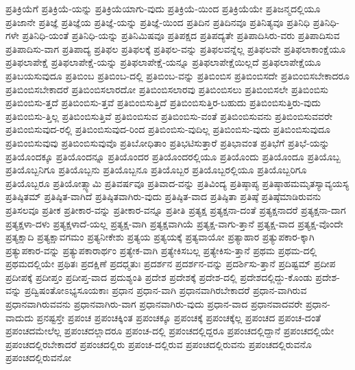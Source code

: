 {ಪ್ರತಿಕ್ರಿಯೆಗೆ
ಪ್ರತಿಕ್ರಿಯೆ-ಯನ್ನು
ಪ್ರತಿಕ್ರಿಯೆಯಾಗು-ವುದು
ಪ್ರತಿಕ್ರಿಯೆ-ಯಿಂದ
ಪ್ರತಿಕ್ರಿಯೆಯೇ
ಪ್ರತಿಜನ್ಮದಲ್ಲಿಯೂ
ಪ್ರತಿಜಾನೇ
ಪ್ರತಿಜ್ಞೆ
ಪ್ರತಿಜ್ಞೆಯ
ಪ್ರತಿಜ್ಞೆ-ಯನ್ನು
ಪ್ರತಿಜ್ಞೆ-ಯಿಂದ
ಪ್ರತಿದಿನ
ಪ್ರತಿದಿನವೂ
ಪ್ರತಿನಿತ್ಯವೂ
ಪ್ರತಿನಿಧಿ
ಪ್ರತಿನಿಧಿ-ಗಳೇ
ಪ್ರತಿನಿಧಿ-ಯಂತೆ
ಪ್ರತಿನಿಧಿ-ಯನ್ನು
ಪ್ರತಿನಿಮಿಷವೂ
ಪ್ರತಿಪಕ್ಷದ
ಪ್ರತಿಪದ್ಯತೇ
ಪ್ರತಿಪಾದಿಸಿರು-ವರು
ಪ್ರತಿಪಾದಿಸುವ
ಪ್ರತಿಪಾದಿಸು-ವಾಗ
ಪ್ರತಿಪಾದ್ಯ
ಪ್ರತಿಫಲ
ಪ್ರತಿಫಲಕ್ಕೆ
ಪ್ರತಿಫಲ-ವನ್ನು
ಪ್ರತಿಫಲವನ್ನೆಲ್ಲ
ಪ್ರತಿಫಲವೇ
ಪ್ರತಿಫಲಾಕಾಂಕ್ಷೆಯೂ
ಪ್ರತಿಫಲಾಪೇಕ್ಷೆ
ಪ್ರತಿಫಲಾಪೇಕ್ಷೆ-ಯನ್ನು
ಪ್ರತಿಫಲಾಪೇಕ್ಷೆ-ಯನ್ನೂ
ಪ್ರತಿಫಲಾಪೇಕ್ಷೆಯಿಲ್ಲದೆ
ಪ್ರತಿಫಲಾಪೇಕ್ಷೆಯೂ
ಪ್ರತಿಬಯಸುವುದೂ
ಪ್ರತಿಬಿಂಬ
ಪ್ರತಿಬಿಂಬ-ದಲ್ಲಿ
ಪ್ರತಿಬಿಂಬ-ವನ್ನು
ಪ್ರತಿಬಿಂಬಿಸ
ಪ್ರತಿಬಿಂಬಿಸದೇ
ಪ್ರತಿಬಿಂಬಿಸಬೇಕಾದರೂ
ಪ್ರತಿಬಿಂಬಿಸಬೇಕಾದರೆ
ಪ್ರತಿಬಿಂಬಿಸಲಾರದೋ
ಪ್ರತಿಬಿಂಬಿಸಲಾರವು
ಪ್ರತಿಬಿಂಬಿಸಲು
ಪ್ರತಿಬಿಂಬಿಸಲೇ
ಪ್ರತಿಬಿಂಬಿಸು
ಪ್ರತಿಬಿಂಬಿಸು-ತ್ತದೆ
ಪ್ರತಿಬಿಂಬಿಸು-ತ್ತವೆ
ಪ್ರತಿಬಿಂಬಿಸುತ್ತಿದೆ
ಪ್ರತಿಬಿಂಬಿಸುತ್ತಿರ-ಬಹುದು
ಪ್ರತಿಬಿಂಬಿಸುತ್ತಿರು-ವುದು
ಪ್ರತಿಬಿಂಬಿಸು-ತ್ತಿಲ್ಲ
ಪ್ರತಿಬಿಂಬಿಸುತ್ತಿವೆ
ಪ್ರತಿಬಿಂಬಿಸುವ
ಪ್ರತಿಬಿಂಬಿಸು-ವಂತೆ
ಪ್ರತಿಬಿಂಬಿಸುವನು
ಪ್ರತಿಬಿಂಬಿಸುವವರೇ
ಪ್ರತಿಬಿಂಬಿಸುವುದ-ರಲ್ಲಿ
ಪ್ರತಿಬಿಂಬಿಸುವುದ-ರಿಂದ
ಪ್ರತಿಬಿಂಬಿಸು-ವುದಿಲ್ಲ
ಪ್ರತಿಬಿಂಬಿಸು-ವುದು
ಪ್ರತಿಬಿಂಬಿಸುವುದೂ
ಪ್ರತಿಬಿಂಬಿಸುವುವು
ಪ್ರತಿಬಿಂಬಿಸುವುವೊ
ಪ್ರತಿಬೋಧಿತಾಂ
ಪ್ರತಿಭಟಿಸುತ್ತಾರೆ
ಪ್ರತಿಭಾವಂತ
ಪ್ರತಿಭೆಗೆ
ಪ್ರತಿಭೆ-ಯನ್ನು
ಪ್ರತಿಯೊಂದಕ್ಕೂ
ಪ್ರತಿಯೊಂದನ್ನೂ
ಪ್ರತಿಯೊಂದರ
ಪ್ರತಿಯೊಂದರಲ್ಲಿಯೂ
ಪ್ರತಿಯೊಂದು
ಪ್ರತಿಯೊಂದೂ
ಪ್ರತಿಯೊಬ್ಬ
ಪ್ರತಿಯೊಬ್ಬನಿಗೂ
ಪ್ರತಿಯೊಬ್ಬನು
ಪ್ರತಿಯೊಬ್ಬನೂ
ಪ್ರತಿಯೊಬ್ಬರ
ಪ್ರತಿಯೊಬ್ಬರಲ್ಲಿಯೂ
ಪ್ರತಿಯೊಬ್ಬರಿಗೂ
ಪ್ರತಿಯೊಬ್ಬರೂ
ಪ್ರತಿಯೋತ್ಸ್ಯಾಮಿ
ಪ್ರತಿವರ್ಷವೂ
ಪ್ರತಿವಾದ-ವನ್ನು
ಪ್ರತಿವಿಂದ್ಯ
ಪ್ರತಿಷ್ಠಾಪ್ಯ
ಪ್ರತಿಷ್ಠಾಹಮಮೃತಸ್ಯಾವ್ಯಯಸ್ಯ
ಪ್ರತಿಷ್ಠಿತಮ್
ಪ್ರತಿಷ್ಠಿತ-ವಾಗಿದೆ
ಪ್ರತಿಷ್ಠಿತವಾಗಿರು-ವುದು
ಪ್ರತಿಷ್ಠಿತ-ವಾದ
ಪ್ರತಿಷ್ಠಿತಾ
ಪ್ರತಿಷ್ಠೆ
ಪ್ರತಿಷ್ಠೆಮಾಡಿರುವನು
ಪ್ರತಿಸಲವೂ
ಪ್ರತೀಕ
ಪ್ರತೀಕಾರ-ವನ್ನು
ಪ್ರತೀಕಾರ-ವನ್ನೂ
ಪ್ರತೀತಿ
ಪ್ರತ್ಯಕ್ಷ
ಪ್ರತ್ಯಕ್ಷನಾ-ದಂತೆ
ಪ್ರತ್ಯಕ್ಷನಾದರೆ
ಪ್ರತ್ಯಕ್ಷನಾ-ದಾಗ
ಪ್ರತ್ಯಕ್ಷಳಾ-ದಳು
ಪ್ರತ್ಯಕ್ಷಳಾದೆ-ಯಲ್ಲ
ಪ್ರತ್ಯಕ್ಷ-ವಾಗಿ
ಪ್ರತ್ಯಕ್ಷವಾಗಿಯೆ
ಪ್ರತ್ಯಕ್ಷ-ವಾಗು-ತ್ತಾನೆ
ಪ್ರತ್ಯಕ್ಷ-ವಾದ
ಪ್ರತ್ಯಕ್ಷ-ವೊಂದೇ
ಪ್ರತ್ಯಕ್ಷಾದಿ
ಪ್ರತ್ಯಕ್ಷಾವಗಮಂ
ಪ್ರತ್ಯನೀಕೇಶು
ಪ್ರತ್ಯಯ
ಪ್ರತ್ಯಯಕ್ಕೆ
ಪ್ರತ್ಯವಾಯೋ
ಪ್ರತ್ಯಾಹಾರ
ಪ್ರತ್ಯುಪಕಾರ-ಕ್ಕಾಗಿ
ಪ್ರತ್ಯುಪಕಾರ-ವನ್ನು
ಪ್ರತ್ಯುಪಕಾರಾರ್ಥಂ
ಪ್ರತ್ಯೇಕ-ವಾಗಿ
ಪ್ರತ್ಯೇಕಿಸಬಲ್ಲ
ಪ್ರತ್ಯೇಕಿಸು-ತ್ತಾನೆ
ಪ್ರಥಮ
ಪ್ರಥಮ-ದಲ್ಲಿ
ಪ್ರಥಮದಲ್ಲಿಯೇ
ಪ್ರಥಿತಃ
ಪ್ರದಕ್ಷಿಣೆ
ಪ್ರದಧ್ಮತುಃ
ಪ್ರದರ್ಶನ
ಪ್ರದರ್ಶನ-ವನ್ನು
ಪ್ರದರ್ಶಿಸು-ತ್ತಾನೆ
ಪ್ರದಿಷ್ಟಮ್
ಪ್ರದೀಪ
ಪ್ರದೀಪಕ್ಕೆ
ಪ್ರದೀಪ್ತಂ
ಪ್ರದೀಪ್ತ-ವಾದ
ಪ್ರದುಶ್ಯಂತಿ
ಪ್ರದೇಶ
ಪ್ರದೇಶಕ್ಕೆ
ಪ್ರದೇಶ-ದಲ್ಲಿ
ಪ್ರದೇಶದಲ್ಲಿದ್ದು-ಕೊಂಡು
ಪ್ರದೇಶ-ವನ್ನು
ಪ್ರದ್ವಿಷಂತೋಽಭ್ಯಸೂಯಕಾಃ
ಪ್ರಧಾನ
ಪ್ರಧಾನ-ವಾಗಿ
ಪ್ರಧಾನವಾಗಿರಬೇಕಾದರೆ
ಪ್ರಧಾನ-ವಾಗಿರುವ
ಪ್ರಧಾನವಾಗಿರುವವನು
ಪ್ರಧಾನವಾಗಿರು-ವಾಗ
ಪ್ರಧಾನವಾಗಿರು-ವುದು
ಪ್ರಧಾನ-ವಾದ
ಪ್ರಧಾನವಾದವರೇ
ಪ್ರಧಾನ-ವಾದುದು
ಪ್ರನಷ್ಟಸ್ತೇ
ಪ್ರಪಂಚ
ಪ್ರಪಂಚಕ್ಕಿಂತ
ಪ್ರಪಂಚಕ್ಕೂ
ಪ್ರಪಂಚಕ್ಕೆ
ಪ್ರಪಂಚಕ್ಕೆಲ್ಲ
ಪ್ರಪಂಚದ
ಪ್ರಪಂಚ-ದಂತೆ
ಪ್ರಪಂಚದಮೇಲೆಲ್ಲ
ಪ್ರಪಂಚದಲ್ಲಾದರೂ
ಪ್ರಪಂಚ-ದಲ್ಲಿ
ಪ್ರಪಂಚದಲ್ಲಿದ್ದರೂ
ಪ್ರಪಂಚದಲ್ಲಿದ್ದಾನೆ
ಪ್ರಪಂಚದಲ್ಲಿಯೇ
ಪ್ರಪಂಚದಲ್ಲಿರಬೇಕಾದರೆ
ಪ್ರಪಂಚದಲ್ಲಿರು
ಪ್ರಪಂಚ-ದಲ್ಲಿರುವ
ಪ್ರಪಂಚದಲ್ಲಿರುವನು
ಪ್ರಪಂಚದಲ್ಲಿರುವನೊ
ಪ್ರಪಂಚದಲ್ಲಿರುವನೋ
}

